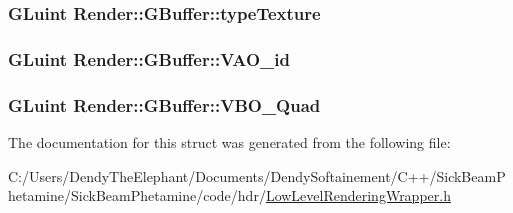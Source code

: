 \subsubsection[{\texorpdfstring{type\+Texture}{typeTexture}}]{\setlength{\rightskip}{0pt plus 5cm}G\+Luint Render\+::\+G\+Buffer\+::type\+Texture}\hypertarget{struct_render_1_1_g_buffer_a49ff8613babaa597e9104da8816beda2}{}\label{struct_render_1_1_g_buffer_a49ff8613babaa597e9104da8816beda2}
\subsubsection[{\texorpdfstring{V\+A\+O\+\_\+id}{VAO_id}}]{\setlength{\rightskip}{0pt plus 5cm}G\+Luint Render\+::\+G\+Buffer\+::\+V\+A\+O\+\_\+id}\hypertarget{struct_render_1_1_g_buffer_a2b51083537c9bd11c9106fe8cca8222b}{}\label{struct_render_1_1_g_buffer_a2b51083537c9bd11c9106fe8cca8222b}
\subsubsection[{\texorpdfstring{V\+B\+O\+\_\+\+Quad}{VBO_Quad}}]{\setlength{\rightskip}{0pt plus 5cm}G\+Luint Render\+::\+G\+Buffer\+::\+V\+B\+O\+\_\+\+Quad}\hypertarget{struct_render_1_1_g_buffer_a1355609eac190e5aaccf2923cc8ae6f2}{}\label{struct_render_1_1_g_buffer_a1355609eac190e5aaccf2923cc8ae6f2}


The documentation for this struct was generated from the following file\+:\begin{DoxyCompactItemize}
\item 
C\+:/\+Users/\+Dendy\+The\+Elephant/\+Documents/\+Dendy\+Softainement/\+C++/\+Sick\+Beam\+Phetamine/\+Sick\+Beam\+Phetamine/code/hdr/\hyperlink{_low_level_rendering_wrapper_8h}{Low\+Level\+Rendering\+Wrapper.\+h}\end{DoxyCompactItemize}
